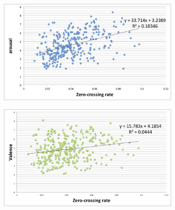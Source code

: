 \begin{figure}
          \centering
        \begin{subfigure}[b]{0.48\textwidth}
                \includegraphics[width=\textwidth]{Figures/zerocrossing-arousal}
			   \vspace{20pt}
        \end{subfigure}
        \begin{subfigure}[b]{0.48\textwidth}
                \includegraphics[width=\textwidth]{Figures/zerocrossing-valence}
                  \vspace{20pt}
        \end{subfigure}
        

\end{figure}
